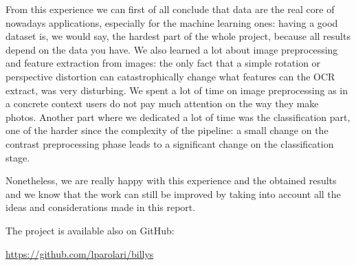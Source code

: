 \documentclass[10pt,twocolumn,letterpaper]{article}
\begin{document}
From this experience we can first of all conclude that data are the
real core of nowadays applications, especially for the machine
learning ones: having a good dataset is, we would say, the hardest
part of the whole project, because all results depend on the data you
have. We also learned a lot about image preprocessing and feature
extraction from images: the only fact that a simple rotation or
perspective distortion can catastrophically change what features can
the OCR extract, was very disturbing. We spent a lot of time on image
preprocessing as in a concrete context users do not pay much attention
on the way they make photos. Another part where we dedicated a lot of
time was the classification part, one of the harder since the
complexity of the pipeline: a small change on the contrast
preprocessing phase leads to a significant change on the
classification stage.

Nonetheless, we are really happy with this experience and the obtained
results and we know that the work can still be improved by taking into
account all the ideas and considerations made in this report.

The project is available also on GitHub:
\begin{center}
  \href{https://github.com/lparolari/billys}{https://github.com/lparolari/billys}
\end{center}

{\small


}
\end{document}
